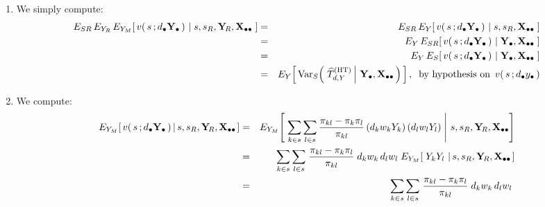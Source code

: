 \begin{enumerate}
\item
    We simply compute:
    \begin{eqnarray*}
    E_{SR}\,
    E_{Y_{R}}\,
    E_{Y_{M}}\!\left[\,
        v(\,s\,;d_{\bullet}\mathbf{Y}_{\bullet}\,)
        \,\left\vert\;
        s,s_{R},\mathbf{Y}_{\!R},\mathbf{X}_{\bullet\bullet}
        \right.
        \,\right]
    & = &
        E_{SR}\,
        E_{Y}\!\left[\,
            v(\,s\,;d_{\bullet}\mathbf{Y}_{\bullet}\,)
            \,\left\vert\;
            s,s_{R},\mathbf{X}_{\bullet\bullet}
            \right.
            \,\right]
    \\
    & = &
        E_{Y}\,
        E_{SR}\!\left[\,
            v(\,s\,;d_{\bullet}\mathbf{Y}_{\bullet}\,)
            \,\left\vert\;
            \mathbf{Y}_{\bullet},\mathbf{X}_{\bullet\bullet}
            \right.
            \,\right]
    \\
    & = &
        E_{Y}\,
        E_{S}\!\left[\,
            v(\,s\,;d_{\bullet}\mathbf{Y}_{\bullet}\,)
            \,\left\vert\;
            \mathbf{Y}_{\bullet},\mathbf{X}_{\bullet\bullet}
            \right.
            \,\right]
    \\
    & = &
        E_{Y}\!\left[\,
            \textnormal{Var}_{S}\!\left(\,
                \left.
                \widehat{T}^{\textnormal{(HT)}}_{d,Y}
                \,\right\vert\,
                \mathbf{Y}_{\bullet},
                \mathbf{X}_{\bullet\bullet}
                \,\right)
            \,\right],
    \;\;
    \textnormal{by hypothesis on \,$v(\,s\,;d_{\bullet}y_{\bullet}\,)$}
    \end{eqnarray*}
\item
    We compute:
    \begin{eqnarray*}
    E_{Y_{M}}\!\left[\,
        v(\,s\,;\dbullet\Ydot\,)
        \left\vert\,
        s,s_{R},\YsubR,\Xobs
        \right.
        \right]
    & = &
        E_{Y_{M}}\!\left[\,
            \left.
            \underset{k \in s}{\sum}\,
            \underset{l \in s}{\sum}\,
            \dfrac{\pi_{kl} - \pi_{k}\pi_{l}}{\pi_{kl}}\,
            (d_{k}w_{k}Y_{k})\,(d_{l}w_{l}Y_{l})
            \;\right\vert\,
            s,s_{R},\YsubR,\Xobs
            \right]
    \\
    & = &
        \underset{k \in s}{\sum}\,
        \underset{l \in s}{\sum}\;
        \dfrac{\pi_{kl} - \pi_{k}\pi_{l}}{\pi_{kl}}\;
        d_{k}w_{k}\,d_{l}w_{l}\;
        E_{Y_{M}}\!\left[\;
            Y_{k}Y_{l}
            \,\left\vert\,
            s,s_{R},\YsubR,\Xobs
            \right.
            \right]
    \\
    & = &
        \underset{k \in s}{\sum}\,
        \underset{l \in s}{\sum}\;
        \dfrac{\pi_{kl} - \pi_{k}\pi_{l}}{\pi_{kl}}\;
        d_{k}w_{k}\,d_{l}w_{l}\;

\end{eqnarray*}
\end{enumerate}
